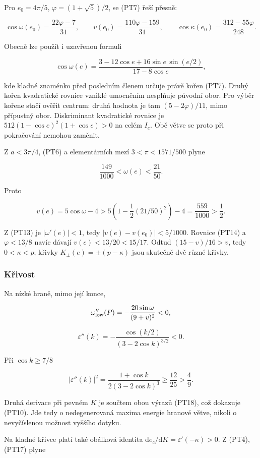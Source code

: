 \documentclass[11pt,a4paper]{article}
\theoremstyle{remark}\newtheorem{remark}[theorem]{Poznámka}
\numberwithin{equation}{section}
\begin{document}
Pro \(e_0=4\pi/5\), \(\varphi=(1+\sqrt5)/2\), se (PT7)
řeší přesně:

\[
\cos\omega(e_0)=\frac{22\varphi-7}{31},\qquad
v(e_0)=\frac{110\varphi-159}{31},\qquad
\cos\kappa(e_0)=\frac{312-55\varphi}{248}.
\tag{PT14}
\]

Obecně lze použít i uzavřenou formuli

\[
\cos\omega(e)=
\frac{3-12\cos e+16\sin e\,\sin(e/2)}
     {17-8\cos e},
\tag{PT15}
\]

kde kladné znaménko před posledním členem určuje právě kořen
(PT7). Druhý kořen kvadratické rovnice vzniklé umocněním nesplňuje
původní obor. Pro výběr kořene stačí ověřit centrum: druhá hodnota
je tam \((5-2\varphi)/11\), mimo přípustný obor. Diskriminant
kvadratické rovnice je \(512(1-\cos e)^2(1+\cos e)>0\) na celém
\(I_e\). Obě větve se proto při pokračování nemohou zaměnit.

Z \(a<3\pi/4\), (PT6) a elementárních mezí
\(3<\pi<1571/500\) plyne

\[
\frac{149}{1000}<\omega(e)<\frac{21}{50}.
\tag{PT16}
\]

Proto

\[
v(e)=5\cos\omega-4
>5\left(1-\frac12(21/50)^2\right)-4
=\frac{559}{1000}>\frac12.
\tag{PT17}
\]

Z (PT13) je \(|\omega'(e)|<1\), tedy
\(|v(e)-v(e_0)|<5/1000\).
Rovnice (PT14) a \(\varphi<13/8\) navíc dávají
\(v(e)<13/20<15/17\). Odtud
\((15-v)/16>v\), tedy \(0<\kappa<p\);
křivky \(K_\pm(e)=\pm(p-\kappa)\) jsou skutečně dvě různé křivky.

\subsubsection{Křivost}\label{kux159ivost}

Na nízké hraně, mimo její konce,

\[
\omega_{\rm low}''(P)
=-\frac{20\sin\omega}{(9+v)^2}<0,
\]

\[
\varepsilon''(k)=
-\frac{\cos(k/2)}{(3-2\cos k)^{3/2}}<0.
\tag{PT18}
\]

Při \(\cos k\ge7/8\)

\[
|\varepsilon''(k)|^2
=\frac{1+\cos k}{2(3-2\cos k)^3}
\ge\frac{12}{25}>\frac49.
\tag{PT19}
\]

Druhá derivace při pevném \(K\) je součtem obou výrazů (PT18),
což dokazuje (PT10). Jde tedy o nedegenerovaná maxima energie
hranové větve, nikoli o nevyčíslenou možnost vyššího dotyku.

Na kladné křivce platí také obálková identita
\(\mathrm de_c/\mathrm dK=\varepsilon'(-\kappa)>0\).
Z (PT4), (PT17) plyne
\end{document}
